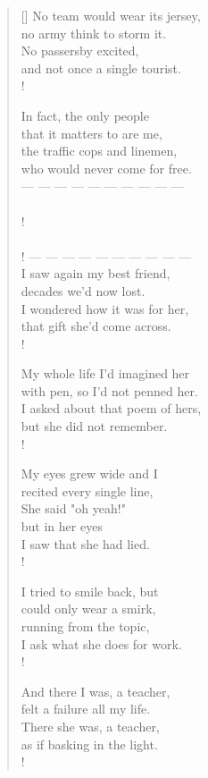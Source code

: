 \documentclass[12pt]{article}
\begin{document}
\begin{multicols}{2}
\begin{verse}[\versewidth]
No team would wear its jersey, \\
no army think to storm it. \\
No passersby excited, \\
and not once a single tourist. \\!

In fact, the only people \\
that it matters to are me, \\
the traffic cops and linemen, \\
who would never come for free. \\

— — — — — — — — — — \\
\: 					 \\!
\: 					 \\
\: 					 \\!
— — — — — — — — — — \\

I saw again my best friend, \\
decades we'd now lost. \\
I wondered how it was for her, \\
that gift she'd come across. \\!

My whole life I'd imagined her \\
with pen, so I'd not penned her. \\
I asked about that poem of hers, \\
but she did not remember. \\!

My eyes grew wide and I \\
recited every single line, \\
She said "oh yeah!" \\
but in her eyes \\ 
I saw that she had lied. \\!

I tried to smile back, but \\
could only wear a smirk, \\
running from the topic, \\
I ask what she does for work. \\!

And there I was, a teacher, \\
felt a failure all my life. \\
There she was, a teacher, \\
as if basking in the light. \\!

\end{verse}
\end{multicols}
\end{document}
